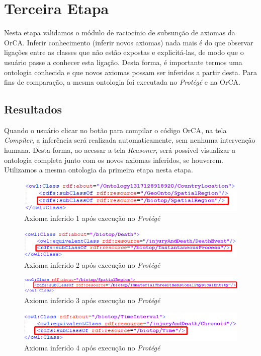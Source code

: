 \documentclass{bcc}
\begin{document}
\section{Terceira Etapa}
Nesta etapa validamos o módulo de raciocínio de subsunção de axiomas da OrCA. Inferir conhecimento (inferir novos axiomas) nada mais é do que observar ligações entre as classes que não estão expostas e explicitá-las, de modo que o usuário passe a conhecer esta ligação. Desta forma, é importante termos uma ontologia conhecida e que novos axiomas possam ser inferidos a partir desta. Para fins de comparação, a mesma ontologia foi executada no \textit{Protégé} e na OrCA.

\subsection{Resultados}
Quando o usuário clicar no botão para compilar o código OrCA, na tela \textit{Compiler}, a inferência será realizada automaticamente, sem nenhuma intervenção humana. Desta forma, ao acessar a tela \textit{Reasoner}, será possível visualizar a ontologia completa junto com os novos axiomas inferidos, se houverem. Utilizamos a mesma ontologia da primeira etapa nesta etapa.

\begin{figure}[H]
\centering
\includegraphics[width=.7\textwidth]{Figuras/e3_axioma1.png}
\caption{Axioma inferido 1 após execução no \textit{Protégé}} 
\label{fig:e3_axioma1}
\end{figure}
\begin{figure}[H]
\centering
\includegraphics[width=.7\textwidth]{Figuras/e3_axioma2.png}
\caption{Axioma inferido 2 após execução no \textit{Protégé}} 
\label{fig:e3_axioma2}
\end{figure}
\begin{figure}[H]
\centering
\includegraphics[width=.8\textwidth]{Figuras/e3_axioma3.png}
\caption{Axioma inferido 3 após execução no \textit{Protégé}} 
\label{fig:e3_axioma3}
\end{figure}
\begin{figure}[H]
\centering
\includegraphics[width=.7\textwidth]{Figuras/e3_axioma4.png}
\caption{Axioma inferido 4 após execução no \textit{Protégé}} 
\label{fig:e3_axioma4}
\end{figure}
\end{document}
